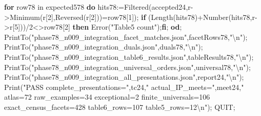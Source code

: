 \documentclass[
  10pt,
  letterpaper,
]{article}
\newenvironment{Shaded}{}{}
\newcommand{\BuiltInTok}[1]{\textcolor[rgb]{0.00,0.50,0.00}{#1}}
\newcommand{\ControlFlowTok}[1]{\textcolor[rgb]{0.00,0.44,0.13}{\textbf{#1}}}
\newcommand{\ExtensionTok}[1]{#1}
\newcommand{\FloatTok}[1]{\textcolor[rgb]{0.25,0.63,0.44}{#1}}
\newcommand{\NormalTok}[1]{#1}
\newcommand{\OperatorTok}[1]{\textcolor[rgb]{0.40,0.40,0.40}{#1}}
\newcommand{\StringTok}[1]{\textcolor[rgb]{0.25,0.44,0.63}{#1}}
\newcommand{\VariableTok}[1]{\textcolor[rgb]{0.10,0.09,0.49}{#1}}
\begin{document}
\begin{Shaded}
\begin{Highlighting}[]
\ControlFlowTok{for} \VariableTok{row78} \ExtensionTok{in} \VariableTok{expected578} \ControlFlowTok{do}
 \VariableTok{hits78}\OperatorTok{:=}\BuiltInTok{Filtered}\NormalTok{(}\VariableTok{accepted24}\OperatorTok{,}\VariableTok{r}\OperatorTok{{-}\textgreater{}}\BuiltInTok{Minimum}\NormalTok{(}\VariableTok{r}\NormalTok{[}\FloatTok{2}\NormalTok{]}\OperatorTok{,}\BuiltInTok{Reversed}\NormalTok{(}\VariableTok{r}\NormalTok{[}\FloatTok{2}\NormalTok{]))}\OperatorTok{=}\VariableTok{row78}\NormalTok{[}\FloatTok{1}\NormalTok{])}\OperatorTok{;}
 \ControlFlowTok{if}\NormalTok{ (}\BuiltInTok{Length}\NormalTok{(}\VariableTok{hits78}\NormalTok{)}\OperatorTok{+}\BuiltInTok{Number}\NormalTok{(}\VariableTok{hits78}\OperatorTok{,}\VariableTok{r}\OperatorTok{{-}\textgreater{}}\VariableTok{r}\NormalTok{[}\FloatTok{5}\NormalTok{]))}\OperatorTok{/}\FloatTok{2}\OperatorTok{\textless{}\textgreater{}}\VariableTok{row78}\NormalTok{[}\FloatTok{2}\NormalTok{] }\ControlFlowTok{then} \BuiltInTok{Error}\NormalTok{(}\StringTok{"Table5 count"}\NormalTok{)}\OperatorTok{;}\ControlFlowTok{fi}\OperatorTok{;}
\ControlFlowTok{od}\OperatorTok{;}
\BuiltInTok{PrintTo}\NormalTok{(}\StringTok{"phase78\_n009\_integration\_facet\_matches.json"}\OperatorTok{,}\VariableTok{facetRows78}\OperatorTok{,}\StringTok{"\textbackslash{}n"}\NormalTok{)}\OperatorTok{;}
\BuiltInTok{PrintTo}\NormalTok{(}\StringTok{"phase78\_n009\_integration\_duals.json"}\OperatorTok{,}\VariableTok{duals78}\OperatorTok{,}\StringTok{"\textbackslash{}n"}\NormalTok{)}\OperatorTok{;}
\BuiltInTok{PrintTo}\NormalTok{(}\StringTok{"phase78\_n009\_integration\_table6\_results.json"}\OperatorTok{,}\VariableTok{tableResults78}\OperatorTok{,}\StringTok{"\textbackslash{}n"}\NormalTok{)}\OperatorTok{;}
\BuiltInTok{PrintTo}\NormalTok{(}\StringTok{"phase78\_n009\_integration\_universal\_orders.json"}\OperatorTok{,}\VariableTok{universal78}\OperatorTok{,}\StringTok{"\textbackslash{}n"}\NormalTok{)}\OperatorTok{;}
\BuiltInTok{PrintTo}\NormalTok{(}\StringTok{"phase78\_n009\_integration\_all\_presentations.json"}\OperatorTok{,}\VariableTok{report24}\OperatorTok{,}\StringTok{"\textbackslash{}n"}\NormalTok{)}\OperatorTok{;}
\BuiltInTok{Print}\NormalTok{(}\StringTok{"PASS complete\_presentations="}\OperatorTok{,}\VariableTok{tc24}\OperatorTok{,}\StringTok{" actual\_IP\_meets="}\OperatorTok{,}\VariableTok{meet24}\OperatorTok{,}\StringTok{" atlas=72 raw\_examples=34 exceptional=2 finite\_universals=106 exact\_census\_facets=428 table6\_rows=107 table5\_rows=12\textbackslash{}n"}\NormalTok{)}\OperatorTok{;}
\VariableTok{QUIT}\OperatorTok{;}
\end{Highlighting}
\end{Shaded}
\end{document}
